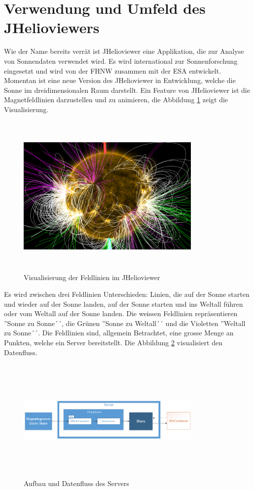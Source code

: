 \section{Verwendung und Umfeld des JHelioviewers}
Wie der Name bereits verrät ist JHelioviewer eine Applikation, die zur Analyse von Sonnendaten verwendet wird. Es wird international zur Sonnenforschung eingesetzt und wird von der FHNW zusammen mit der ESA entwickelt. Momentan ist eine neue Version des JHelioviewer in Entwicklung, welche die Sonne im dreidimensionalen Raum darstellt. Ein Feature von JHelioviewer ist die Magnetfeldlinien darzustellen und zu animieren, die Abbildung \ref{einleitung::feldlinien} zeigt die Visualisierung.
\begin{figure}[!htbp]
\center
	\includegraphics[width=0.8\textwidth,height=8cm,keepaspectratio]{./pictures/einleitung/fieldLines.png}
	\caption{Visualisierung der Feldlinien im JHelioviewer}
	\label{einleitung::feldlinien}
\end{figure}
Es wird zwischen drei Feldlinien Unterschieden: Linien, die auf der Sonne starten und wieder auf der Sonne landen, auf der Sonne starten und ins Weltall führen oder vom Weltall auf der Sonne landen. Die weissen Feldlinien repräsentieren ''Sonne zu Sonne´´, die Grünen ''Sonne zu Weltall´´ und die Violetten ''Weltall zu Sonne´´. Die Feldlinien sind, allgemein Betrachtet, eine grosse Menge an Punkten, welche ein Server bereitstellt. Die Abbildung \ref{einleitung::aufbau} visualisiert den Datenfluss.
\begin{figure}[!htbp]
\center
	\includegraphics[width=0.8\textwidth,height=6cm,keepaspectratio]{./pictures/einleitung/server.png}
	\caption{Aufbau und Datenfluss des Servers}
	\label{einleitung::aufbau}
\end{figure}
